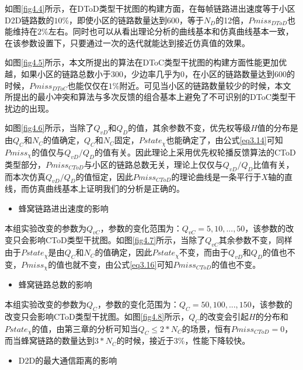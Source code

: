 \documentclass[figurelist,tablelist,algorithmlist,nomlist,masters]{seuthesix}
\begin{document}
	如图\ref{fig4.4}所示，在DToD类型干扰图的构建方面，在每帧链路进出速度等于小区D2D链路数的$10\%$，即使小区的链路数量达到$600$，等于$N_{D}$的12倍，$Pmiss_{DToD}$也能维持在$2\%$左右。同时也可以从看出理论分析的曲线基本和仿真曲线基本一致，在该参数设置下，只要通过一次的迭代就能达到接近仿真值的效果。

	如图\ref{fig4.5}所示，本文所提出的算法在DToC类型干扰图的构建方面性能更加优越，如果小区的链路总数小于$300$，少边率几乎为0，在小区的链路数量达到$600$的时候，$Pmiss_{DToC}$也能仅仅在$1\%$附近。可见当小区的链路数量较少的时候，本文所提出的最小冲突和算法与多次反馈的组合基本上避免了不可识别的DToC类型干扰边的出现。

	如图\ref{fig4.6}所示，当除了$Q_{vD}$和$Q_D$的值，其余参数不变，优先权等级$H$值的分布是由$Q_C$和$N_C$的值确定，$Q_C$和$N_C$固定，$Pstate_{\chi }$也能确定了，由公式\ref{eq3.14}可知$Pmiss_{\chi }$的值仅与$Q_{vD}/Q_D$的值有关。因此理论上采用优先权轮播反馈算法的CToD类型部分，$Pmiss_{CToD}$与小区的链路总数无关，理论上仅仅与$Q_{vD}/Q_D$比值有关，而本次仿真$Q_{vD}/Q_D$的值恒定，因此$Pmiss_{CToD}$的理论曲线是一条平行于$X$轴的直线，而仿真曲线基本上证明我们的分析是正确的。

	
	\begin{itemize}
		\item 蜂窝链路进出速度的影响
	\end{itemize}

	本组实验改变的参数为$Q_{vC}$，参数的变化范围为：$Q_{vC} = 5,10,...,50$，该参数的改变只会影响CToD类型干扰图。如图\ref{fig4.7}所示，当除了$Q_{vC}$其余参数不变，同样由于$Pstate_{\chi }$是由$Q_C$和$N_C$的值确定，因此$Pstate_{\chi }$不变，而由于$Q_{vD}$和$Q_D$的值也不变，$Pmiss_{\chi }$的值也就不变，由公式\ref{eq3.16}可知$Pmiss_{CToD}$的值也不变。

	\begin{itemize}
		\item 蜂窝链路总数的影响
	\end{itemize}

	本组实验改变的参数为$Q_{C}$，参数的变化范围为：$Q_{C} = 50,100,...,150$，该参数的改变只会影响CToD类型干扰图。如图\ref{fig4.8}所示，$Q_{C}$的改变会引起$H$的分布和$Pstate_{\chi }$的值，由第三章的分析可知当$Q_{C} \le 2 * N_C$的场景，恒有$Pmiss_{CToD} = 0$，而当蜂窝链路的数量达到$3 * N_{C}$的时候，接近于$3\%$，性能下降较快。
	

	\begin{itemize}
		\item D2D的最大通信距离的影响
	\end{itemize}
\end{document}
